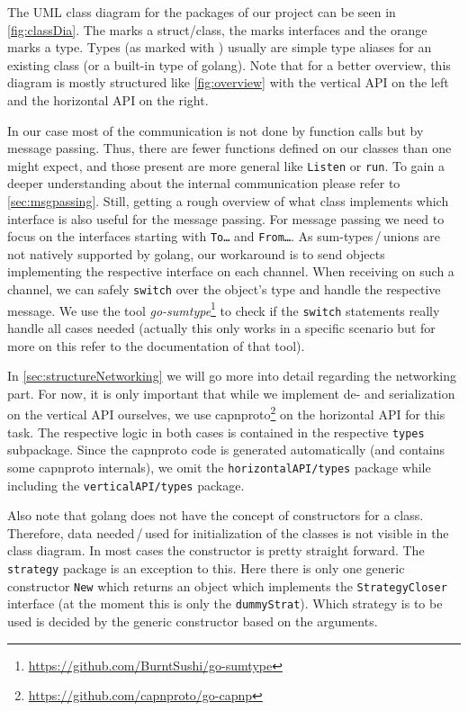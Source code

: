 \documentclass[a4paper,english,10pt,NET]{tumarticle}
\begin{document}
The UML class diagram for the packages of our project can be seen in \cref{fig:classDia}.
The  marks a struct/class, the  marks interfaces and the orange  marks a type.
Types (as marked with ) usually are simple type aliases for an existing class (or a built-in type of golang).
Note that for a better overview, this diagram is mostly structured like \cref{fig:overview} with the vertical API on the left and the horizontal API on the right.

In our case most of the communication is not done by function calls but by message passing.
Thus, there are fewer functions defined on our classes than one might expect, and those present are more general like \texttt{Listen} or \texttt{run}.
To gain a deeper understanding about the internal communication please refer to \cref{sec:msgpassing}.
Still, getting a rough overview of what class implements which interface is also useful for the message passing. \label{sumtypes}
For message passing we need to focus on the interfaces starting with \texttt{To\ldots} and \texttt{From\ldots}.
As sum-types\,/\,unions are not natively supported by golang, our workaround is to send objects implementing the respective interface on each channel.
When receiving on such a channel, we can safely \texttt{switch} over the object's type and handle the respective message.
We use the tool \emph{go-sumtype}\footnote{\url{https://github.com/BurntSushi/go-sumtype}} to check if the \texttt{switch} statements really handle all cases needed (actually this only works in a specific scenario but for more on this refer to the documentation of that tool).

In \cref{sec:structureNetworking} we will go more into detail regarding the networking part.
For now, it is only important that while we implement de- and serialization on the vertical API ourselves, we use capnproto\footnote{\url{https://github.com/capnproto/go-capnp}} on the horizontal API for this task.
The respective logic in both cases is contained in the respective \texttt{types} subpackage.
Since the capnproto code is generated automatically (and contains some capnproto internals), we omit the \texttt{horizontalAPI/types} package while including the \texttt{verticalAPI/types} package.

Also note that golang does not have the concept of constructors for a class.
Therefore, data needed\,/\,used for initialization of the classes is not visible in the class diagram.
In most cases the constructor is pretty straight forward.
The \texttt{strategy} package is an exception to this.
Here there is only one generic constructor \texttt{New} which returns an object which implements the \texttt{StrategyCloser} interface (at the moment this is only the \texttt{dummyStrat}).
Which strategy is to be used is decided by the generic constructor based on the arguments.
\end{document}
